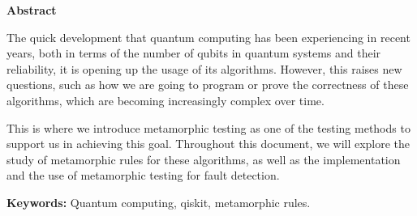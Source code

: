 \newpage

\thispagestyle{empty}

\begin{center}

{\bf \Huge Abstract}

  \end{center}
\vspace{1cm}

The quick development that quantum computing has been experiencing in recent years, both in terms of the number of qubits in quantum systems and their reliability,  it is opening up the usage of its algorithms. However, this raises new questions, such as how we are going to program or prove the correctness of these algorithms, which are becoming increasingly complex over time.\newline

This is where we introduce metamorphic testing as one of the testing methods to support us in achieving this goal. Throughout this document, we will explore the study of metamorphic rules for these algorithms, as well as the implementation and the use of metamorphic testing for fault detection.
\vspace{2cm}

\textbf{Keywords:} Quantum computing, qiskit, metamorphic rules.